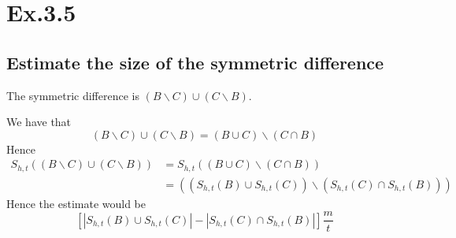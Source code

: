 \section*{Ex.3.5}
\subsection*{Estimate the size of the symmetric difference}
The symmetric difference is $(B\backslash C)\cup (C \backslash B)$.

We have that 
$$
(B\backslash C)\cup (C \backslash B) = (B \cup C)\backslash (C \cap B)
$$
Hence
\begin{align*}
S_{h,t}((B\backslash C)\cup (C \backslash B)) 
  &= S_{h,t}((B \cup C)\backslash (C \cap B))\\
  &= ((S_{h,t}(B) \cup S_{h,t}(C))\backslash (S_{h,t}(C) \cap S_{h,t}(B)))
\end{align*}
Hence the estimate would be
$$
[\left|S_{h,t}(B) \cup S_{h,t}(C)\right| - \left|S_{h,t}(C) \cap S_{h,t}(B)\right|]\frac{m}{t}
$$